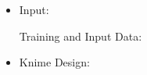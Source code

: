 \documentclass[a4paper,12pt]{article}
\begin{document}
\newpage
	\begin{itemize} 	

\item Input:

Training and Input Data:
 \begin{center}
	\begin{figure}[!htbp]
		\centering
	\end{figure}
\end{center} 

\begin{center}
	\begin{figure}[!htbp]
		\centering
	\end{figure}
\end{center} 

\newpage
\item Knime Design:


\end{itemize}
\end{document}
